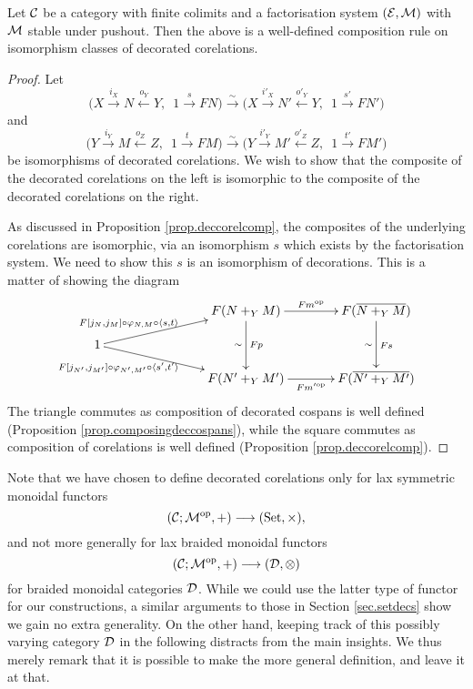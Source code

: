\begin{proposition} \label{prop.deccorelcomp}
  Let $\mathcal C$ be a category with finite colimits and a factorisation system
  $(\mathcal E,\mathcal M)$ with $\mathcal M$ stable under pushout. Then the above is a
  well-defined composition rule on isomorphism classes of decorated corelations.
\end{proposition}
\begin{proof}
Let 
\[
  \big(X \stackrel{i_X}\longrightarrow N \stackrel{o_Y}\longleftarrow Y,\enspace 1
\stackrel{s}\longrightarrow FN\big) \stackrel\sim\longrightarrow \big(X \stackrel{i'_X}\longrightarrow N'
\stackrel{o'_Y}\longleftarrow Y,\enspace 1 \stackrel{s'}\longrightarrow FN'\big)
\]
and
\[
  \big(Y \stackrel{i_Y}\longrightarrow M \stackrel{o_Z}\longleftarrow Z,\enspace 1
\stackrel{t}\longrightarrow FM\big) \stackrel\sim\longrightarrow \big(Y \stackrel{i'_Y}\longrightarrow M'
\stackrel{o'_Z}\longleftarrow Z,\enspace 1 \stackrel{t'}\longrightarrow FM'\big)
\]
be isomorphisms of decorated corelations. We wish to show that the composite of the
decorated corelations on the left is isomorphic to the composite of the decorated
corelations on the right. 

As discussed in Proposition \ref{prop.deccorelcomp}, the composites of the
underlying corelations are isomorphic, via an isomorphism $s$ which exists by the
factorisation system. We need to show this $s$ is an isomorphism of decorations.
This is a matter of showing the diagram 
\[
    \xymatrixcolsep{3pc}
    \xymatrixrowsep{1pc}
 \xymatrix{
   && F(N+_YM) \ar[r]^{Fm^\opp} \ar[dd]_\sim^{Fp} & F(\overline{N+_YM})
   \ar[dd]_\sim^{Fs} \\
   1 \ar[urr]^(.4){F[j_N,j_M]\circ\varphi_{N,M}\circ \langle s,t \rangle\qquad}
   \ar[drr]_(.4){F[j_{N'},j_{M'}]\circ\varphi_{N',M'}\circ \langle s',t'
 \rangle\qquad\quad} \\
   && F(N'+_YM') \ar[r]_{Fm'^\opp} & F(\overline{N'+_YM'})\\
 }
\]
The triangle commutes as composition of decorated cospans is well defined
(Proposition \ref{prop.composingdeccospans}), while the square commutes as
composition of corelations is well defined (Proposition
\ref{prop.deccorelcomp}).
\end{proof}

\begin{remark}
  Note that we have chosen to define decorated corelations only for lax symmetric
  monoidal functors 
  \[
    (\mathcal C;\mathcal M^{\mathrm{op}},+) \longrightarrow (\mathrm{Set}, \times),
  \]
  and not more generally for lax braided monoidal functors 
  \[
    (\mathcal C;\mathcal M^{\mathrm{op}},+) \longrightarrow (\mathcal D, \otimes)
  \]
  for braided monoidal categories $\mathcal D$. While we could use the latter type of
  functor for our constructions, a similar arguments to those in Section
  \ref{sec.setdecs} show we gain no extra generality. On the other hand, keeping
  track of this possibly varying category $\mathcal D$ in the following distracts
  from the main insights. We thus merely remark that it is possible to make the
  more general definition, and leave it at that.
\end{remark}

